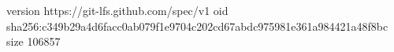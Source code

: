 version https://git-lfs.github.com/spec/v1
oid sha256:c349b29a4d6facc0ab079f1e9704c202cd67abdc975981e361a984421a48f8bc
size 106857
